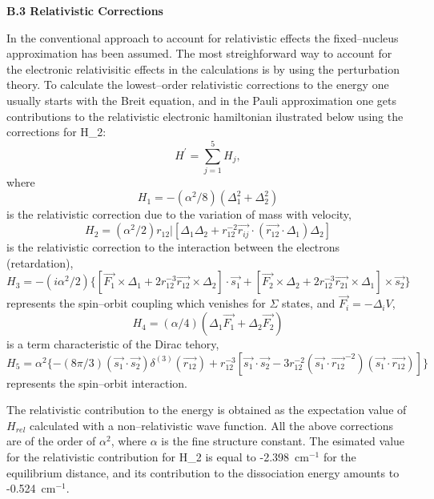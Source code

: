 \vspace{2mm}
\noindent
{\bf B.3 Relativistic Corrections}



In the conventional approach to account for relativistic 
effects the 
fixed--nucleus approximation has been assumed.
The most streighforward way to account for the 
electronic relativisitic
effects in the calculations is by using the perturbation theory.
To calculate the lowest--order relativistic corrections to the
energy one usually starts with the Breit equation,\cite{k15}
and in the Pauli approximation one gets contributions to the 
relativistic electronic hamiltonian ilustrated below using the
corrections for H{_2}:
\begin{equation}
H^{\prime} = \sum_{j=1}^{5} H_j,
\end{equation}
where
\begin{equation}
H_1 = -(\alpha^2/8)(\Delta_1^2 + \Delta_2^2)
\end{equation}
is the relativistic correction due to the variation of mass with velocity,
\begin{equation} 
H_2 = (\alpha^2/2) r_{12} | [\Delta_1 \Delta_2 +
r_{12}^{-2} \vec{r_{ij}} \cdot (\vec{r_{12}} \cdot \Delta_1)\Delta_2]
\end{equation}
is the relativistic correction to the interaction
between the electrons (retardation),
\begin{equation}
H_3 = -(i \alpha^2/2) \{ [ \vec{F_1} \times \Delta_1 +
2 r_{12}^{-3}  \vec{r_{12}} \times \Delta_2 ] \cdot \vec{s_1}
+ [\vec{F_2} \times \Delta_2 + 2 r_{12}^{-3} \vec{r_{21}}
\times \Delta_1] \times \vec{s_2} \}
\end{equation}
represents the spin--orbit coupling which venishes for $\Sigma$
states, and $\vec{F_i} = -\Delta_i V$,
\begin{equation}
H_4 = (\alpha / 4) (\Delta_1 \vec{F_1} + \Delta_2 \vec{F_2})
\end{equation}
is a term  characteristic of the Dirac tehory,
\begin{equation}
H_5 = \alpha^2 \{ -(8\pi/3)(\vec{s_1} \cdot \vec{s_2})
\delta^{(3)}(\vec{r_{12}}) +
r_{12}^{-3} [\vec{s_1} \cdot \vec{s_2} -
3 r_{12}^{-2} (\vec{s_1} \cdot \vec{r_{12}}^{-2})
(\vec{s_1} \cdot \vec{r_{12}} ) ] \}
\end{equation}
represents the spin--orbit interaction.

The relativistic contribution to the energy is obtained as the 
expectation value of $H_{rel}$ calculated with a non--relativistic
wave function. All the above corrections are of the order of
$\alpha^2$, where $\alpha$ is the fine structure constant.
The esimated value for the relativistic contribution for H_{2} is 
equal to -2.398~cm$^{-1}$ for the equilibrium distance,\cite{kk} and
its contribution to the dissociation energy amounts to
-0.524~cm$^{-1}$.


